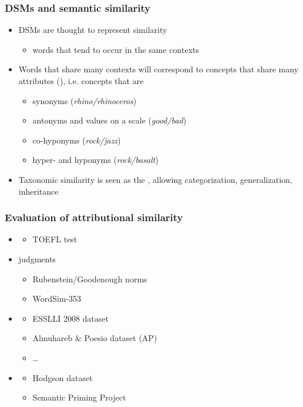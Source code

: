 \documentclass[t]{beamer} %
\begin{document}
\begin{frame}
  \frametitle{DSMs and semantic similarity}
  \begin{itemize}
   \item DSMs are thought to represent  similarity
   \begin{itemize}
    \item words that tend to occur in the same contexts
    \end{itemize}
  \item Words that share many contexts will correspond to concepts
    that share many attributes (),
    i.e. concepts that are 
    \begin{itemize}
    \item synonyms (\emph{rhino/rhinoceros})
    \item antonyms and values on a
      scale (\emph{good/bad})
      \item co-hyponyms (\emph{rock/jazz})
      \item hyper- and hyponyms (\emph{rock/basalt})
    \end{itemize}
  \item Taxonomic similarity is seen as the , allowing categorization, generalization, inheritance
  \end{itemize}
\end{frame}

\begin{frame}
  \frametitle{Evaluation of attributional similarity}
  
  \begin{itemize}
  \item {}
    \begin{itemize}
    \item TOEFL test
    \end{itemize}
  \item {} judgments
    \begin{itemize}
    \item Rubenstein/Goodenough norms
    \item WordSim-353
    \end{itemize}
  \item {}
    \begin{itemize}
    \item ESSLLI 2008 dataset
    \item Almuhareb \& Poesio dataset (AP)
    \item \ldots
    \end{itemize}
  \item {}
    \begin{itemize}
    \item Hodgson dataset
    \item Semantic Priming Project 
    \end{itemize}
  \end{itemize}
\end{frame}
\end{document}
